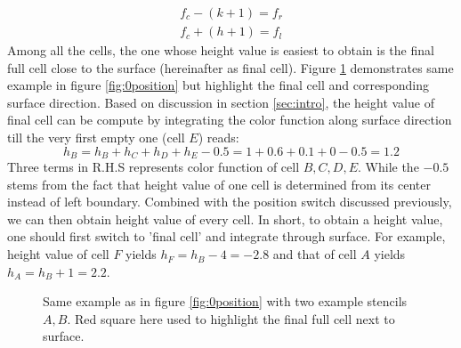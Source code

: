\documentclass[a4paper]{article}
\newcommand{\para}[1]{\textbf{\emph{\textcolor{para}{#1}}}}
\begin{document}
\begin{align}
    f_c-(k+1)=f_r\\
    f_c+(h+1)=f_l
\end{align}
Among all the cells, the one whose height value is easiest to obtain is the final full cell close to the surface (hereinafter as final cell). Figure \ref{fig:hvcomp} demonstrates same example in figure \ref{fig:0position} but highlight the final cell and corresponding surface direction. Based on discussion in section \ref{sec:intro}, the height value of final cell can be compute by integrating the color function along surface direction till the very first empty one (cell $E$) reads:
\begin{equation}
    h_B=h_B+h_C+h_D+h_E-0.5=1+0.6+0.1+0-0.5=1.2
\end{equation}
Three terms in R.H.S represents color function of cell $B,C,D,E$.
While the $-0.5$ stems from the fact that height value of one cell is determined from its center instead of left boundary. Combined with the position switch discussed previously, we can then obtain height value of every cell. In short, to obtain a height value, one should first switch to 'final cell' and integrate through surface. For example, height value of cell $F$ yields $h_F=h_B-4=-2.8$ and that of cell $A$ yields $h_A=h_B+1=2.2$.
\begin{figure}
    \centering
    \caption{Same example as in figure \ref{fig:0position} with two example stencils $A,B$. Red square here used to highlight the final full cell next to surface.}
    \label{fig:hvcomp}
\end{figure}
\end{document}
